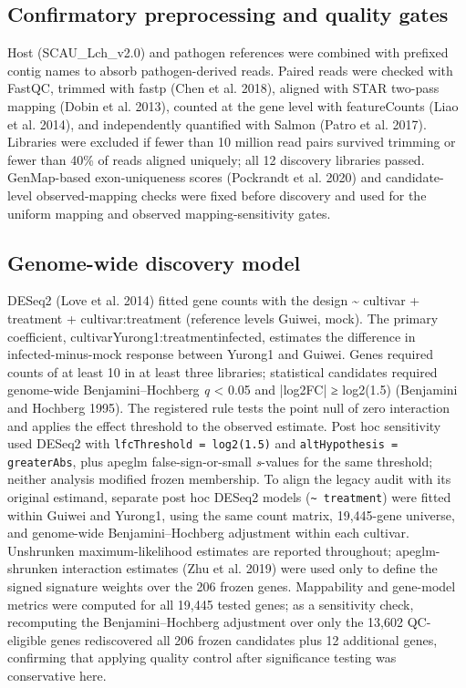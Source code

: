 \documentclass[12pt,letterpaper]{article}
\begin{document}
\subsection*{Confirmatory preprocessing and quality gates}

Host (SCAU\_Lch\_v2.0) and pathogen references were combined with prefixed contig names to absorb pathogen-derived reads. Paired reads were checked with FastQC, trimmed with fastp (Chen et al. 2018), aligned with STAR two-pass mapping (Dobin et al. 2013), counted at the gene level with featureCounts (Liao et al. 2014), and independently quantified with Salmon (Patro et al. 2017). Libraries were excluded if fewer than 10 million read pairs survived trimming or fewer than 40\% of reads aligned uniquely; all 12 discovery libraries passed. GenMap-based exon-uniqueness scores (Pockrandt et al. 2020) and candidate-level observed-mapping checks were fixed before discovery and used for the uniform mapping and observed mapping-sensitivity gates.

\subsection*{Genome-wide discovery model}

DESeq2 (Love et al. 2014) fitted gene counts with the design \textasciitilde{} cultivar + treatment + cultivar:treatment (reference levels Guiwei, mock). The primary coefficient, cultivarYurong1:treatmentinfected, estimates the difference in infected-minus-mock response between Yurong1 and Guiwei. Genes required counts of at least 10 in at least three libraries; statistical candidates required genome-wide Benjamini–Hochberg \textit{q} < 0.05 and |log2FC| ≥ log2(1.5) (Benjamini and Hochberg 1995). The registered rule tests the point null of zero interaction and applies the effect threshold to the observed estimate. Post hoc sensitivity used DESeq2 with \texttt{lfcThreshold = log2(1.5)} and \texttt{altHypothesis = greaterAbs}, plus apeglm false-sign-or-small \textit{s}-values for the same threshold; neither analysis modified frozen membership. To align the legacy audit with its original estimand, separate post hoc DESeq2 models (\texttt{\textasciitilde{} treatment}) were fitted within Guiwei and Yurong1, using the same count matrix, 19,445-gene universe, and genome-wide Benjamini–Hochberg adjustment within each cultivar. Unshrunken maximum-likelihood estimates are reported throughout; apeglm-shrunken interaction estimates (Zhu et al. 2019) were used only to define the signed signature weights over the 206 frozen genes. Mappability and gene-model metrics were computed for all 19,445 tested genes; as a sensitivity check, recomputing the Benjamini–Hochberg adjustment over only the 13,602 QC-eligible genes rediscovered all 206 frozen candidates plus 12 additional genes, confirming that applying quality control after significance testing was conservative here.
\end{document}
